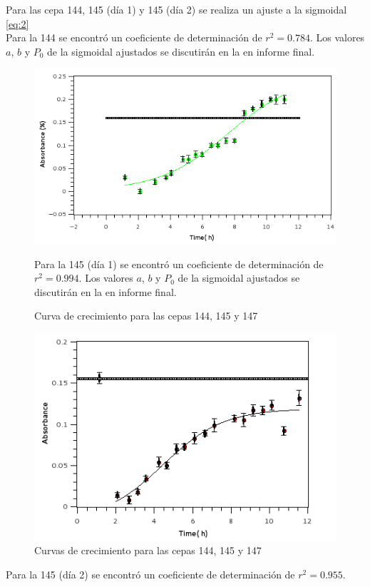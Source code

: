 \documentclass[%
 reprint,
 amsmath,amssymb,
 aps,
]{revtex4-1}
\begin{document}
 Para las cepa 144, 145 (día 1) y 145 (día 2) se realiza un ajuste a la sigmoidal \eqref{eq:2}\\
 Para la 144 se encontró un coeficiente de determinación de $r^2=0.784$. Los valores $a$, $b$ y $P_{0}$ de la sigmoidal ajustados se discutirán en la en informe final.
\begin{figure}[h]
\includegraphics[width=\linewidth]{curvas/gra144.png}
  \caption{Curva de crecimiento para las cepas 144, 145 y 147}
  \label{fig:cur2}
   Para la 145  (día 1) se encontró un coeficiente de determinación de $r^2=0.994$.
   Los valores $a$, $b$ y $P_{0}$ de la sigmoidal ajustados se discutirán en la en informe final.
\end{figure}
\begin{figure}[h]
 \includegraphics[width=\linewidth]{curvas/gra145dia1.png}
  \caption{Curvas de crecimiento para las cepas 144, 145 y 147}
  \label{fig:cur3}
\end{figure}
 Para la 145  (día 2) se encontró un coeficiente de determinación de $r^2=0.955$. 
\end{document}
